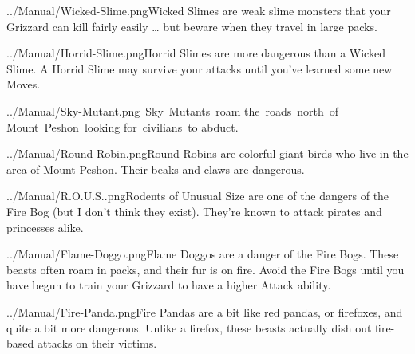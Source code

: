 \documentclass[9pt,twocolumn,openany,article]{memoir}
\newcommand\englishskip{\vspace{14pt}}
\begin{document}
{%
\englishskip

\lettrine[image=true,                lines=4,               findent=3pt,
nindent=3pt]{../Manual/Wicked-Slime.png}{}\noindent{}Wicked  Slimes  are
weak slime  monsters that  your Grizzard  can kill  fairly easily  … but
beware when they travel in large packs.

\englishskip

\lettrine[image=true,                lines=4,               findent=3pt,
nindent=3pt]{../Manual/Horrid-Slime.png}{}\noindent{}Horrid  Slimes  are
more dangerous  than a  Wicked Slime.  A Horrid  Slime may  survive your
attacks until you've learned some new Moves.

\englishskip

\lettrine[image=true,                lines=4,               findent=3pt,
nindent=3pt]{../Manual/Sky-Mutant.png}{}\noindent{}~Sky~Mutants~roam
the~roads~north~of Mount~Peshon~looking for~civilians~to abduct.

\englishskip

\lettrine[image=true,                lines=4,               findent=3pt,
nindent=3pt]{../Manual/Round-Robin.png}{}\noindent{}Round   Robins   are
colorful giant birds  who live in the area of  Mount Peshon. Their beaks
and claws are dangerous.

\englishskip

\lettrine[image=true,                lines=4,               findent=3pt,
nindent=3pt]{../Manual/R.O.U.S..png}{}\noindent{}Rodents of Unusual Size
are one of the  dangers of the Fire Bog (but I  don't think they exist).
They're known to attack pirates and princesses alike.

\englishskip

\lettrine[image=true,                lines=4,               findent=3pt,
nindent=3pt]{../Manual/Flame-Doggo.png}{}\noindent{}Flame   Doggos   are
a danger of the  Fire Bogs. These beasts often roam  in packs, and their
fur is on fire.  Avoid the Fire Bogs until you have  begun to train your
Grizzard to have a higher Attack ability.

\englishskip

\lettrine[image=true,                lines=4,               findent=3pt,
nindent=3pt]{../Manual/Fire-Panda.png}{}\noindent{}Fire Pandas are a bit
like  red  pandas,  or  firefoxes,  and  quite  a  bit  more  dangerous.
Unlike a firefox,  these beasts actually dish out  fire-based attacks on
their victims.

\englishskip

}
\end{document}
